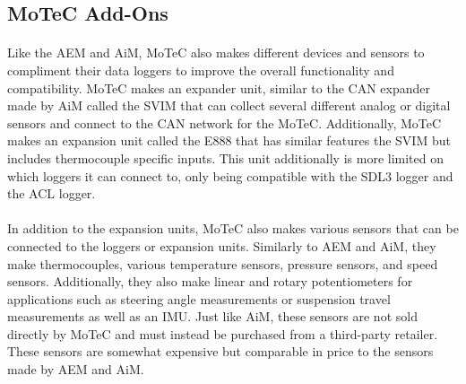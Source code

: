 \subsection{MoTeC Add-Ons}

\paragraph{}
Like the AEM and AiM, MoTeC also makes different devices and sensors to compliment their data loggers to improve the overall functionality and compatibility.
MoTeC makes an expander unit, similar to the CAN expander made by AiM called the SVIM that can collect several different analog or digital sensors and connect to the CAN network for the MoTeC.
Additionally, MoTeC makes an expansion unit called the E888 that has similar features the SVIM but includes thermocouple specific inputs.
This unit additionally is more limited on which loggers it can connect to, only being compatible with the SDL3 logger and the ACL logger.

\paragraph{}
In addition to the expansion units, MoTeC also makes various sensors that can be connected to the loggers or expansion units.
Similarly to AEM and AiM, they make thermocouples, various temperature sensors, pressure sensors, and speed sensors.
Additionally, they also make linear and rotary potentiometers for applications such as steering angle measurements or suspension travel measurements as well as an IMU.
Just like AiM, these sensors are not sold directly by MoTeC and must instead be purchased from a third-party retailer.
These sensors are somewhat expensive but comparable in price to the sensors made by AEM and AiM.